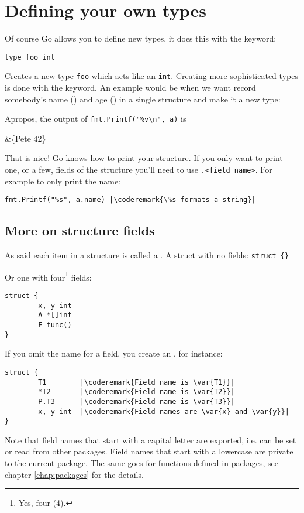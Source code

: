 \section{Defining your own types}
\label{sec:defining your own}
Of course Go allows you to define new types, it does this 
with the  keyword: 
\begin{lstlisting}
type foo int
\end{lstlisting}
Creates
a new type \lstinline{foo} which acts like an \lstinline{int}.
Creating more sophisticated types is done with the
keyword.
An example would be when we want record somebody's name ()
and age () in a single structure and make it a new type:

Apropos, the output of \lstinline{fmt.Printf("%v\n", a)} is 
\begin{display}
&\{Pete 42\}
\end{display}

That is nice!
Go knows how to print your structure. If you
only want to print one, or a few, fields of the structure you'll
need to use \verb|.<field name>|. For example to only print the name:
\begin{lstlisting}
fmt.Printf("%s", a.name) |\coderemark{\%s formats a string}|
\end{lstlisting}

\subsection{More on structure fields}
As said each item in a structure is called a .
A struct with no fields: \lstinline|struct {}|

Or one with four\footnote{Yes, four (4).} fields:
\begin{lstlisting}
struct {
        x, y int
        A *[]int
        F func()
}
\end{lstlisting}
If you omit the name for a field, you create an 
, for instance:
\begin{lstlisting}
struct {
        T1        |\coderemark{Field name is \var{T1}}|
        *T2       |\coderemark{Field name is \var{T2}}|
        P.T3      |\coderemark{Field name is \var{T3}}|
        x, y int  |\coderemark{Field names are \var{x} and \var{y}}|
}
\end{lstlisting}
Note that field names that start with a capital letter are exported, i.e. can be
set or read from other packages. Field names that start with a lowercase are private
to the current package. The same goes for functions defined in packages, see chapter
\ref{chap:packages} for the details.

